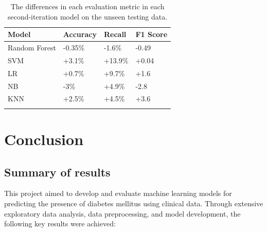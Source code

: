 \documentclass[12pt]{report}
\begin{document}
\pagebreak 
\begin{longtable}{ | p{} | p{} | p{} | p{} | }
    \hline
    \cellcolor{blue!25} Model & \cellcolor{blue!25} Accuracy & \cellcolor{blue!25} Recall & \cellcolor{blue!25} F1 Score\\
    \hline
    Random Forest & \cellcolor{red!25} -0.35\% & \cellcolor{red!25}-1.6\% & \cellcolor{red!25} -0.49\\ 
    \hline
    SVM & \cellcolor{green!18}+3.1\% & \cellcolor{green!18}+13.9\% & \cellcolor{green!18}+0.04\\ 
    \hline
    LR & \cellcolor{green!18}+0.7\% & \cellcolor{green!18}+9.7\% & \cellcolor{green!18}+1.6\\
    \hline
    NB & \cellcolor{red!25}-3\% & \cellcolor{green!18}+4.9\% & \cellcolor{red!25}-2.8\\
    \hline
    KNN & \cellcolor{green!18}+2.5\% & \cellcolor{green!18}+4.5\% & \cellcolor{green!18}+3.6\\
    \hline
    \caption{The differences in each evaluation metric in each second-iteration model on the unseen testing data.}\label{tab:Improvements}
\end{longtable}



\chapter{Conclusion}


\section{Summary of results} 
This project aimed to develop and evaluate machine learning models for predicting the presence of diabetes mellitus using clinical data. 
Through extensive exploratory data analysis, data preprocessing, and model development, the following key results were achieved:
\end{document}
